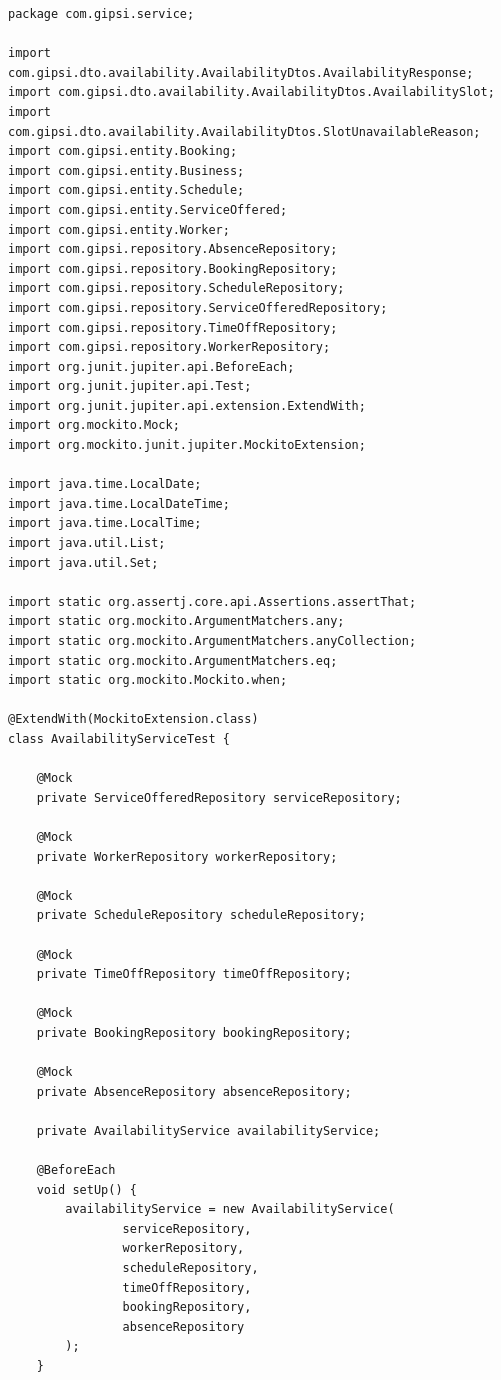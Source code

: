 \documentclass[12pt,a4paper,twoside]{report}
\begin{document}
\begin{lstlisting}[style=javaStyle, caption={Pruebas unitarias del servicio de disponibilidad}, label={lst:test-avail}]
package com.gipsi.service;

import com.gipsi.dto.availability.AvailabilityDtos.AvailabilityResponse;
import com.gipsi.dto.availability.AvailabilityDtos.AvailabilitySlot;
import com.gipsi.dto.availability.AvailabilityDtos.SlotUnavailableReason;
import com.gipsi.entity.Booking;
import com.gipsi.entity.Business;
import com.gipsi.entity.Schedule;
import com.gipsi.entity.ServiceOffered;
import com.gipsi.entity.Worker;
import com.gipsi.repository.AbsenceRepository;
import com.gipsi.repository.BookingRepository;
import com.gipsi.repository.ScheduleRepository;
import com.gipsi.repository.ServiceOfferedRepository;
import com.gipsi.repository.TimeOffRepository;
import com.gipsi.repository.WorkerRepository;
import org.junit.jupiter.api.BeforeEach;
import org.junit.jupiter.api.Test;
import org.junit.jupiter.api.extension.ExtendWith;
import org.mockito.Mock;
import org.mockito.junit.jupiter.MockitoExtension;

import java.time.LocalDate;
import java.time.LocalDateTime;
import java.time.LocalTime;
import java.util.List;
import java.util.Set;

import static org.assertj.core.api.Assertions.assertThat;
import static org.mockito.ArgumentMatchers.any;
import static org.mockito.ArgumentMatchers.anyCollection;
import static org.mockito.ArgumentMatchers.eq;
import static org.mockito.Mockito.when;

@ExtendWith(MockitoExtension.class)
class AvailabilityServiceTest {

    @Mock
    private ServiceOfferedRepository serviceRepository;

    @Mock
    private WorkerRepository workerRepository;

    @Mock
    private ScheduleRepository scheduleRepository;

    @Mock
    private TimeOffRepository timeOffRepository;

    @Mock
    private BookingRepository bookingRepository;

    @Mock
    private AbsenceRepository absenceRepository;

    private AvailabilityService availabilityService;

    @BeforeEach
    void setUp() {
        availabilityService = new AvailabilityService(
                serviceRepository,
                workerRepository,
                scheduleRepository,
                timeOffRepository,
                bookingRepository,
                absenceRepository
        );
    }


\end{lstlisting}
\end{document}
